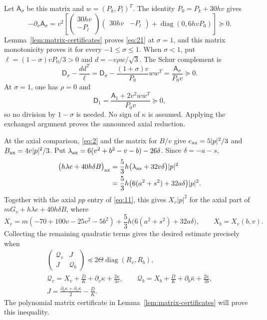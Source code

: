 Let $\mathsf A_\sigma$ be this matrix and $w=(P_k,P_l)^T$.
The identity $P_0=P_k+30hv$ gives
\[
 -\partial_\sigma\mathsf A_\sigma
 =v^2\left[
       \begin{pmatrix}30hv\\-P_l\end{pmatrix}
       \begin{pmatrix}30hv&-P_l\end{pmatrix}
       +\operatorname{diag}(0,6hvP_0)\right]\succeq0.
\]
Lemma~\ref{lem:matrix-certificates} proves \eqref{eq:21} at
$\sigma=1$, and this matrix monotonicity proves it for every
$-1\le\sigma\le1$. When $\sigma<1$, put
$\ell=(1-\sigma)vP_0/3>0$ and $d=-v\rho w/\sqrt3$.
The Schur complement is
\[
 \mathsf D_\sigma-\frac{dd^T}{\ell}
 =\mathsf D_\sigma-\frac{(1+\sigma)v}{P_0}ww^T
 =\frac{\mathsf A_\sigma}{P_0v}\succeq0.
\]
At $\sigma=1$, one has $\rho=0$ and
\[
 \mathsf D_1=\frac{\mathsf A_1+2v^2ww^T}{P_0v}\succeq0,
\]
so no division by $1-\sigma$ is needed. No sign of $\kappa$ is assumed.
Applying the exchanged argument proves the announced axial reduction.

At the axial comparison, \eqref{eq:2} and the matrix for $B/v$ give
$e_{\rm ax}=5|p|^2/3$ and $B_{\rm ax}=4v|p|^2/3$. Put
$\lambda_{\rm ax}=6(v^2+b^2-v-b)-26\delta$. Since $\delta=-a-s$,
\[
\begin{aligned}
\bigl(h\lambda e+40h\delta B\bigr)_{\rm ax}
 &=\frac53h\bigl(\lambda_{\rm ax}+32v\delta\bigr)|p|^2\\
 &=\frac53h\bigl(6(a^2+s^2)+32a\delta\bigr)|p|^2.
\end{aligned}
\]
Together with the axial $pp$ entry of \eqref{eq:11}, this gives
$X_v|p|^2$ for the axial part of $mG_v+h\lambda e+40h\delta B$, where
\[
 X_v=m(-70+100v-25v^2-5b^2)
       +\frac53h\bigl(6(a^2+s^2)+32a\delta\bigr),
 \qquad X_b=X_v(b,v).
\]
Collecting the remaining quadratic terms gives the desired estimate
precisely when
\begin{equation}
\begin{gathered}
 \begin{pmatrix}\mathcal Q_v&J\\J&\mathcal Q_b\end{pmatrix}
       \preceq2\Theta\operatorname{diag}(R_v,R_b),\\
 \mathcal Q_v=X_v+\frac DK+\partial_v\kappa+\frac{2\kappa}{3v},
 \qquad
 \mathcal Q_b=X_b+\frac DK+\partial_b\bar\kappa
                                      +\frac{2\bar\kappa}{3b},\\
 J=\frac{\partial_b\kappa+\partial_v\bar\kappa}{2}-\frac DK.
\end{gathered}
\tag{22}\label{eq:22}
\end{equation}
The polynomial matrix certificate in Lemma~\ref{lem:matrix-certificates}
will prove this inequality.

